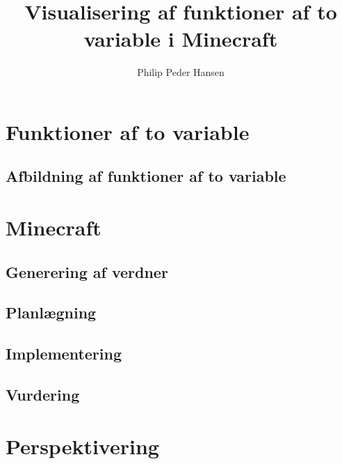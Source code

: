 \documentclass[a4paper,12pt]{report}
\author{Philip Peder Hansen}
\title{Visualisering af funktioner af to variable i Minecraft}
\begin{document}
	\maketitle
	\tableofcontents
	\section{Funktioner af to variable}
	\subsection{Afbildning af funktioner af to variable}
	\section{Minecraft}
	\subsection{Generering af verdner}
	\subsection{Planlægning}
	\subsection{Implementering}
	\subsection{Vurdering}
	\section{Perspektivering}
\end{document}
